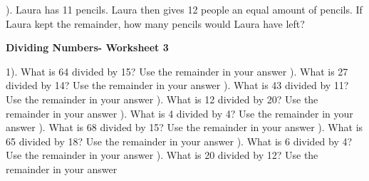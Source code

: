 \documentclass{article}%
\begin{document}
). Laura has 11 pencils. Laura then gives 12 people an equal amount of pencils. If Laura kept the remainder, how many pencils would Laura have left?%
\newline%
\newline%
\newline%
\pagebreak%
\large%
\begin{center}%
\textbf{Dividing Numbers- Worksheet 3}%
\newline%
\newline%
\newline%
\end{center} \normalsize%
1). What is 64 divided by 15? Use the remainder in your answer%
\newline%
\newline%
). What is 27 divided by 14? Use the remainder in your answer%
\newline%
\newline%
). What is 43 divided by 11? Use the remainder in your answer%
\newline%
\newline%
). What is 12 divided by 20? Use the remainder in your answer%
\newline%
\newline%
). What is 4 divided by 4? Use the remainder in your answer%
\newline%
\newline%
). What is 68 divided by 15? Use the remainder in your answer%
\newline%
\newline%
). What is 65 divided by 18? Use the remainder in your answer%
\newline%
\newline%
). What is 6 divided by 4? Use the remainder in your answer%
\newline%
\newline%
). What is 20 divided by 12? Use the remainder in your answer%
\newline%
\newline%
\newline%
\end{document}

